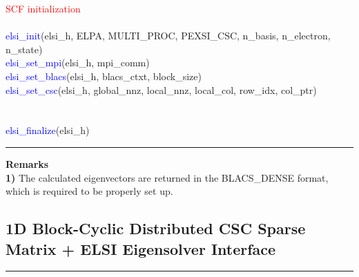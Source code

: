 \documentclass{report}
\begin{document}
\begin{algorithm}[H]
\textcolor{red}{SCF initialization}\\
\hspace{0.3cm}\\
\textcolor{blue}{elsi\_init}(elsi\_h, ELPA, MULTI\_PROC, PEXSI\_CSC, n\_basis, n\_electron, n\_state)\\
\textcolor{blue}{elsi\_set\_mpi}(elsi\_h, mpi\_comm)\\
\textcolor{blue}{elsi\_set\_blacs}(elsi\_h, blacs\_ctxt, block\_size)\\
\textcolor{blue}{elsi\_set\_csc}(elsi\_h, global\_nnz, local\_nnz, local\_col, row\_idx, col\_ptr)\\
\hspace{0.3cm}\\
\hspace{0.3cm}\\
\textcolor{blue}{elsi\_finalize}(elsi\_h)\\
\end{algorithm}

\noindent\rule{18cm}{0.4pt}

\bigskip
\textbf{Remarks}\\

\textbf{1)} The calculated eigenvectors are returned in the BLACS\_DENSE format, which is required to be properly set up.\\

\subsection{1D Block-Cyclic Distributed CSC Sparse Matrix + ELSI Eigensolver Interface}
\label{subsec:example_ev_csc2}
\noindent\rule{18cm}{0.4pt}
\end{document}
